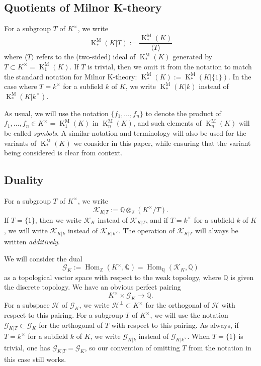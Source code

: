 \documentclass[12pt]{amsart}
\newcommand{\KM}{\operatorname{K}^\mathrm{M}}
\newcommand{\Zbb}{\mathbb{Z}}
\newcommand{\Qbb}{\mathbb{Q}}
\newcommand{\Hom}{\operatorname{Hom}}
\newcommand{\Gcal}{\mathcal{G}}
\newcommand{\Hcal}{\mathcal{H}}
\newcommand{\Kcal}{\mathcal{K}}
\theoremstyle{definition}
\begin{document}
\subsection{Quotients of Milnor K-theory}
For a subgroup $T$ of $K^{\times}$, we write
\[ \KM_{*}(K|T) := \frac{\KM_{*}(K)}{\langle T \rangle} \]
where $\langle T \rangle$ refers to the (two-sided) ideal of $\KM_{*}(K)$ generated by $T \subset K^{\times} = \KM_{1}(K)$.
If $T$ is trivial, then we omit it from the notation to match the standard notation for Milnor K-theory: $\KM_{*}(K) := \KM_{*}(K|\{1\})$.
In the case where $T = k^{\times}$ for a subfield $k$ of $K$, we write $\KM_{*}(K|k)$ instead of $\KM_{*}(K|k^{\times})$.

As usual, we will use the notation $\{f_{1},\ldots,f_{n}\}$ to denote the product of $f_{1},\ldots,f_{n} \in K^{\times} = \KM_{1}(K)$ in $\KM_{n}(K)$, and such elements of $\KM_{n}(K)$ will be called \emph{symbols}.
A similar notation and terminology will also be used for the variants of $\KM_{*}(K)$ we consider in this paper, while ensuring that the variant being considered is clear from context.

\subsection{Duality}

For a subgroup $T$ of $K^{\times}$, we write
\[ \Kcal_{K|T} := \Qbb \otimes_{\Zbb}(K^{\times}/T). \]
If $T = \{1\}$, then we write $\Kcal_{K}$ instead of $\Kcal_{K|T}$, and if $T = k^{\times}$ for a subfield $k$ of $K$, we will write $\Kcal_{K|k}$ instead of $\Kcal_{K|k^{\times}}$.
The operation of $\Kcal_{K|T}$ will always be written \emph{additively}.

We will consider the dual
\[ \Gcal_{K} := \Hom_{\Zbb}(K^{\times},\Qbb) = \Hom_{\Qbb}(\Kcal_{K},\Qbb) \]
as a topological vector space with respect to the weak topology, where $\Qbb$ is given the discrete topology.
We have an obvious perfect pairing
\[ K^{\times} \times \Gcal_{K} \to \Qbb. \]
For a subspace $\Hcal$ of $\Gcal_{K}$, we write $\Hcal^{\perp} \subset K^{\times}$ for the orthogonal of $\Hcal$ with respect to this pairing.
For a subgroup $T$ of $K^{\times}$, we will use the notation $\Gcal_{K|T} \subset \Gcal_{K}$ for the orthogonal of $T$ with respect to this pairing.
As always, if $T = k^{\times}$ for a subfield $k$ of $K$, we write $\Gcal_{K|k}$ instead of $\Gcal_{K|k^{\times}}$.
When $T = \{1\}$ is trivial, one has $\Gcal_{K|T} = \Gcal_{K}$, so our convention of omitting $T$ from the notation in this case still works.
\end{document}
